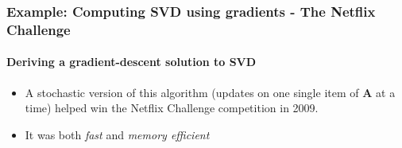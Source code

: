 \documentclass[\beamerclass]{beamer}
\begin{document}
\begin{frame}
\frametitle{Example: Computing SVD using gradients - The Netflix Challenge}
\framesubtitle{Deriving a gradient-descent solution to SVD}

\begin{itemize}
	\item<+-> A stochastic version of this algorithm (updates on one single item of $\bm A$ at a time) helped win the Netflix Challenge competition in 2009.
	\item<+-> It was both \emph{fast} and \emph{memory efficient}
\end{itemize}

\end{frame}
\end{document}
